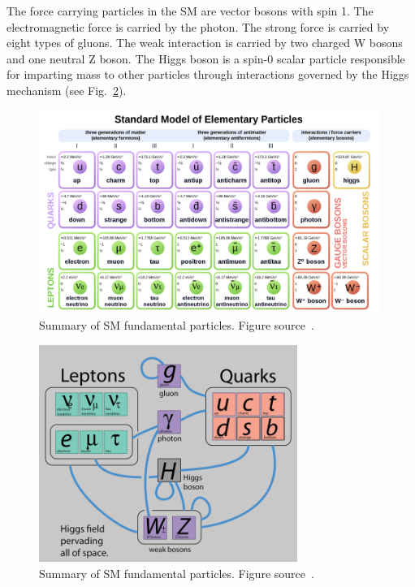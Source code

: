 The force carrying particles in the SM are vector bosons with spin 1. The electromagnetic force is carried by the photon. The strong force is carried by eight types of gluons. The weak interaction is carried by two charged W bosons and one neutral Z boson.
The Higgs boson is a spin-0 scalar particle responsible for imparting mass to other particles through interactions governed by the Higgs mechanism (see Fig.~\ref{fig:SMinteractions}).



\begin{figure}[t!]
\centering
\includegraphics[width=0.99\textwidth]{figures/SM_include_antimatter.png}
\caption[Summary of standard model fundamental particles]{Summary of SM fundamental particles. Figure source~\cite{SMtable}.
\label{fig:SMParticles}}
\end{figure}

\begin{figure}[t!]
\centering
\includegraphics[width=0.75\textwidth]{figures/interactions_SM.png}
\caption[Summary of standard model fundamental particles]{Summary of SM fundamental particles. Figure source~\cite{Particle_interactions}.
\label{fig:SMinteractions}}
\end{figure}
